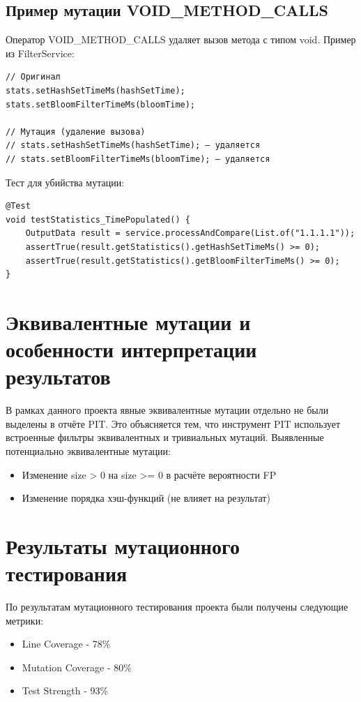 \subsection{Пример мутации VOID\_METHOD\_CALLS}
Оператор VOID\_METHOD\_CALLS удаляет вызов метода с типом void. Пример из FilterService:
\begin{verbatim}
// Оригинал
stats.setHashSetTimeMs(hashSetTime);
stats.setBloomFilterTimeMs(bloomTime);

// Мутация (удаление вызова)
// stats.setHashSetTimeMs(hashSetTime); — удаляется
// stats.setBloomFilterTimeMs(bloomTime); — удаляется
\end{verbatim}

Тест для убийства мутации:
\begin{verbatim}
@Test
void testStatistics_TimePopulated() {
    OutputData result = service.processAndCompare(List.of("1.1.1.1"));
    assertTrue(result.getStatistics().getHashSetTimeMs() >= 0);
    assertTrue(result.getStatistics().getBloomFilterTimeMs() >= 0);
}
\end{verbatim}

\section{Эквивалентные мутации и особенности интерпретации результатов}\label{ch4:sec2}
В рамках данного проекта явные эквивалентные мутации отдельно не были выделены в отчёте PIT. Это объясняется тем, что инструмент PIT использует встроенные фильтры эквивалентных и тривиальных мутаций.
Выявленные потенциально эквивалентные мутации:
\begin{itemize}
    \item Изменение size > 0 на size >= 0 в расчёте вероятности FP
    \item Изменение порядка хэш-функций (не влияет на результат)
\end{itemize}


\section{Результаты мутационного тестирования}\label{ch4:sec3}
По результатам мутационного тестирования проекта были получены следующие метрики:
\begin{itemize}
	\item Line Coverage - 78\%
	\item Mutation Coverage - 80\%
	\item Test Strength - 93\%
\end{itemize}

